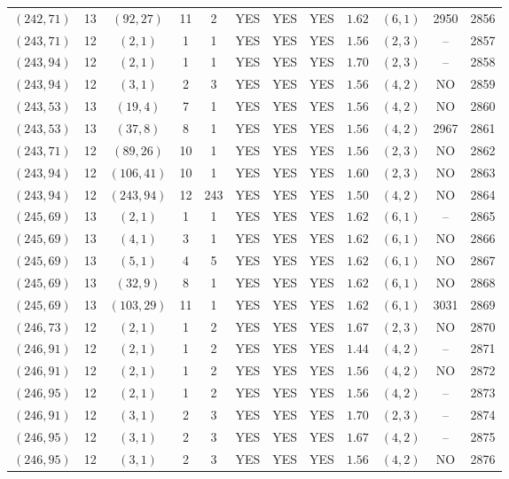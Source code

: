 \begin{longtable}{|c|c|c|c|c|c|c|c|c|c|c|c|}
$(242,71)$ & 13 & $(92,27)$ & 11 & 2 & YES & YES & YES & $1.62$ & $(6,1)$ & 2950 & 2856\\
$(243,71)$ & 12 & $(2,1)$ & 1 & 1 & YES & YES & YES & $1.56$ & $(2,3)$ & -- & 2857\\
$(243,94)$ & 12 & $(2,1)$ & 1 & 1 & YES & YES & YES & $1.70$ & $(2,3)$ & -- & 2858\\
$(243,94)$ & 12 & $(3,1)$ & 2 & 3 & YES & YES & YES & $1.56$ & $(4,2)$ & NO & 2859\\
$(243,53)$ & 13 & $(19,4)$ & 7 & 1 & YES & YES & YES & $1.56$ & $(4,2)$ & NO & 2860\\
$(243,53)$ & 13 & $(37,8)$ & 8 & 1 & YES & YES & YES & $1.56$ & $(4,2)$ & 2967 & 2861\\
$(243,71)$ & 12 & $(89,26)$ & 10 & 1 & YES & YES & YES & $1.56$ & $(2,3)$ & NO & 2862\\
$(243,94)$ & 12 & $(106,41)$ & 10 & 1 & YES & YES & YES & $1.60$ & $(2,3)$ & NO & 2863\\
$(243,94)$ & 12 & $(243,94)$ & 12 & 243 & YES & YES & YES & $1.50$ & $(4,2)$ & NO & 2864\\
$(245,69)$ & 13 & $(2,1)$ & 1 & 1 & YES & YES & YES & $1.62$ & $(6,1)$ & -- & 2865\\
$(245,69)$ & 13 & $(4,1)$ & 3 & 1 & YES & YES & YES & $1.62$ & $(6,1)$ & NO & 2866\\
$(245,69)$ & 13 & $(5,1)$ & 4 & 5 & YES & YES & YES & $1.62$ & $(6,1)$ & NO & 2867\\
$(245,69)$ & 13 & $(32,9)$ & 8 & 1 & YES & YES & YES & $1.62$ & $(6,1)$ & NO & 2868\\
$(245,69)$ & 13 & $(103,29)$ & 11 & 1 & YES & YES & YES & $1.62$ & $(6,1)$ & 3031 & 2869\\
$(246,73)$ & 12 & $(2,1)$ & 1 & 2 & YES & YES & YES & $1.67$ & $(2,3)$ & NO & 2870\\
$(246,91)$ & 12 & $(2,1)$ & 1 & 2 & YES & YES & YES & $1.44$ & $(4,2)$ & -- & 2871\\
$(246,91)$ & 12 & $(2,1)$ & 1 & 2 & YES & YES & YES & $1.56$ & $(4,2)$ & NO & 2872\\
$(246,95)$ & 12 & $(2,1)$ & 1 & 2 & YES & YES & YES & $1.56$ & $(4,2)$ & -- & 2873\\
$(246,91)$ & 12 & $(3,1)$ & 2 & 3 & YES & YES & YES & $1.70$ & $(2,3)$ & -- & 2874\\
$(246,95)$ & 12 & $(3,1)$ & 2 & 3 & YES & YES & YES & $1.67$ & $(4,2)$ & -- & 2875\\
$(246,95)$ & 12 & $(3,1)$ & 2 & 3 & YES & YES & YES & $1.56$ & $(4,2)$ & NO & 2876\\

\end{longtable}
